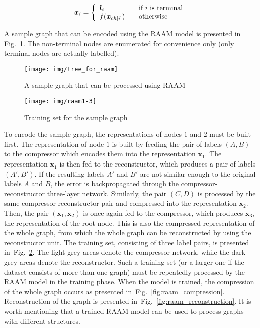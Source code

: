 \begin{equation}
\bm{x}_i = \left\{
\begin{array}{l l}
	\bm{l}_i & \quad \text{if $i$ is terminal} \\
	f(\bm{x}_{ch[i]}) & \quad \text{otherwise}
\end{array}
\right.
\label{eq:raam_representation}
\end{equation}

\noindent A sample graph that can be encoded using the RAAM model is presented in Fig.~\ref{fig:tree_for_raam}. The non-terminal nodes are enumerated for convenience only (only terminal nodes are actually labelled).

\begin{figure}
\begin{center}
	\texttt{[image: img/tree\_for\_raam]}
	\caption{A sample graph that can be processed using RAAM}
	\label{fig:tree_for_raam}
\end{center}
\end{figure}

\begin{figure}
\begin{center}
	\texttt{[image: img/raam1-3]}
	\caption{Training set for the sample graph}
	\label{fig:raam1-3}
\end{center}
\end{figure}

To encode the sample graph, the representations of nodes $1$ and $2$ must be built first. The representation of node $1$ is built by feeding the pair of labels $(A, B)$ to the compressor which encodes them into the representation $\bm{x}_1$. The representation $\bm{x}_1$ is then fed to the reconstructor, which produces a pair of labels $(A', B')$. If the resulting labels $A'$ and $B'$ are not similar enough to the original labels $A$ and $B$, the error is backpropagated through the compressor-reconstructor three-layer network. Similarly, the pair $(C, D)$ is processed by the same compressor-reconstructor pair and compressed into the representation $\bm{x}_2$. Then, the pair $(\bm{x}_1, \bm{x}_2)$ is once again fed to the compressor, which produces $\bm{x}_3$, the representation of the root node. This is also the compressed representation of the whole graph, from which the whole graph can be reconstructed by using the reconstructor unit. The training set, consisting of three label pairs, is presented in~Fig.~\ref{fig:raam1-3}. The light grey areas denote the compressor network, while the dark grey areas denote the reconstructor. Such a training set (or a larger one if the dataset consists of more than one graph) must be repeatedly processed by the RAAM model in the training phase. When the model is trained, the compression of the whole graph occurs as presented in~Fig.~\ref{fig:raam_compression}. Reconstruction of the graph is presented in~Fig.~\ref{fig:raam_reconstruction}. It is worth mentioning that a trained RAAM model can be used to process graphs with different structures.


